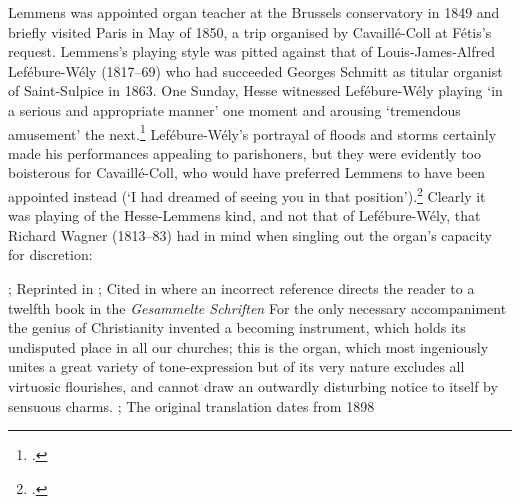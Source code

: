 Lemmens was appointed organ teacher at the Brussels conservatory in 1849 and briefly visited Paris in May of 1850, a trip organised by Cavaillé-Coll at Fétis's request.
Lemmens's playing style was pitted against that of Louis-James-Alfred Lefébure-Wély (1817--69) who had succeeded Georges Schmitt as titular organist of Saint-Sulpice in 1863.
One Sunday, Hesse witnessed Lefébure-Wély playing `in a serious and appropriate manner' one moment and arousing `tremendous amusement' the next.\footcite[55]{HesseEinigesueberOrgeln1853}
Lefébure-Wély's portrayal of floods and storms certainly made his performances appealing to parishoners, but they were evidently too boisterous for Cavaillé-Coll, who would have preferred Lemmens to have been appointed instead (`I had dreamed of seeing you in that position').\footcite[76--7]{DouglassCavailleCollmusiciansdocumented1980}
Clearly it was playing of the Hesse-Lemmens kind, and not that of Lefébure-Wély, that Richard Wagner (1813--83) had in mind when singling out the organ's capacity for discretion:
\pagebreak{}

  {\cite[337]{WagnerEntwurfzurOrganisation1871}; Reprinted in \cite[345]{WagnerKirchenmusik1883}; Cited in \cite[p.~10]{HelfgottOrgelmesseUntersuchungorgelbegleiteten2009} where an incorrect reference directs the reader to a twelfth book in the \emph{Gesammelte Schriften}}
{For the only necessary accompaniment the genius of Christianity invented a becoming instrument, which holds its undisputed place in all our churches; this is the organ, which most ingeniously unites a great variety of tone-expression but of its very nature excludes all virtuosic flourishes, and cannot draw an outwardly disturbing notice to itself by sensuous charms.}
  {\cite[343]{WagnerPlanOrganisationGerman1966}; The original translation dates from 1898}

